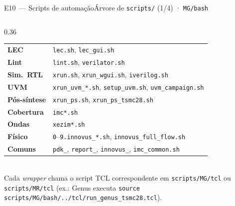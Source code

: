\documentclass[aspectratio=169,10pt,t]{beamer}
\begin{document}
\begin{frame}[fragile]{E10~— Scripts de automação}{Árvore de \texttt{scripts/} (1/4) · \texttt{MG/bash}}
\begin{columns}[T]
\begin{column}{0.36\textwidth}
\begin{tabularx}{\linewidth}{@{}>{\bfseries}l >{\raggedright\arraybackslash}X@{}}
        LEC & \texttt{lec.sh}, \texttt{lec\_gui.sh} \\
        Lint & \texttt{lint.sh}, \texttt{verilator.sh} \\
        Sim.\ RTL & \texttt{xrun.sh}, \texttt{xrun\_wgui.sh}, \texttt{iverilog.sh} \\
        UVM & \texttt{xrun\_uvm\_*.sh}, \texttt{setup\_uvm.sh}, \texttt{uvm\_campaign.sh} \\
        Pós-síntese & \texttt{xrun\_ps.sh}, \texttt{xrun\_ps\_tsmc28.sh} \\
        Cobertura & \texttt{imc*.sh} \\
        Ondas & \texttt{xezim*.sh} \\
        Físico & \texttt{0}--\texttt{9.innovus\_*.sh}, \texttt{innovus\_full\_flow.sh} \\
        Comuns & \texttt{pdk\_}, \texttt{report\_}, \texttt{innovus\_}, \texttt{imc\_common.sh} \\
        \bottomrule
      \end{tabularx}\\[0.15cm]
      {\tiny Cada \emph{wrapper} chama o script TCL correspondente em \texttt{scripts/MG/tcl} ou \texttt{scripts/MR/tcl} (ex.: Genus executa \texttt{source scripts/MG/bash/../tcl/run\_genus\_tsmc28.tcl}).}
    \end{column}
  \end{columns}
\end{frame}
\end{document}

